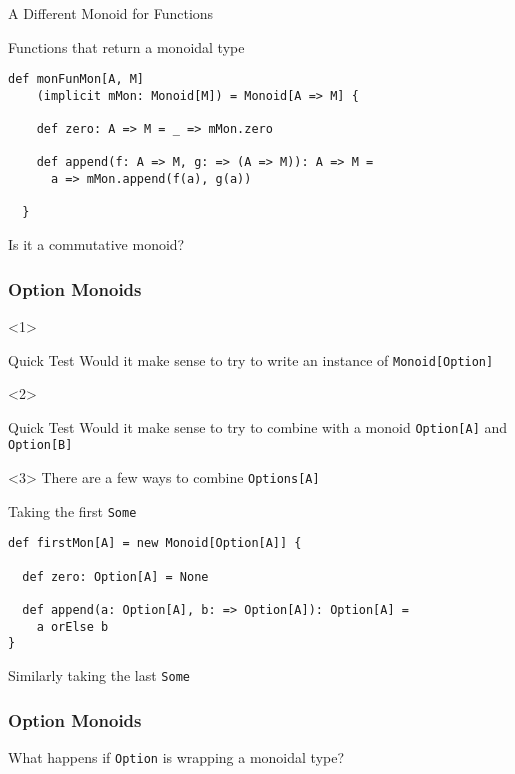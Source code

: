 \documentclass{beamer}
\begin{document}
\begin{framej}
\begin{frame}[fragile]{A Different Monoid for Functions}
\begin{block}{Functions that return a monoidal type}
  \begin{lstlisting}
def monFunMon[A, M]
    (implicit mMon: Monoid[M]) = Monoid[A => M] {

    def zero: A => M = _ => mMon.zero

    def append(f: A => M, g: => (A => M)): A => M =
      a => mMon.append(f(a), g(a))

  }
  \end{lstlisting}
  \end{block}
Is it a commutative monoid?
\end{frame}

\begin{frame}[fragile]
  \frametitle{Option Monoids}
  \begin{onlyenv}<1>
  \begin{block}{Quick Test}
    Would it make sense to try to write an instance of
    \texttt{Monoid[Option]}
  \end{block}
  \end{onlyenv}

  \begin{onlyenv}<2>
  \begin{block}{Quick Test}
    Would it make sense to try to combine with a monoid
    \texttt{Option[A]} and  \texttt{Option[B]}
  \end{block}
  \end{onlyenv}

  \begin{onlyenv}<3>
    There are a few ways to combine \texttt{Options[A]}

  \begin{block}{Taking the first \texttt{Some}}
  \begin{lstlisting}
def firstMon[A] = new Monoid[Option[A]] {

  def zero: Option[A] = None

  def append(a: Option[A], b: => Option[A]): Option[A] =
    a orElse b
}
  \end{lstlisting}
  \end{block}

  Similarly taking the last \texttt{Some}
  \end{onlyenv}

\end{frame}


\begin{frame}[fragile]
  \frametitle{Option Monoids}

  What happens if \texttt{Option} is wrapping a monoidal type?


\end{frame}
\end{framej}
\end{document}
